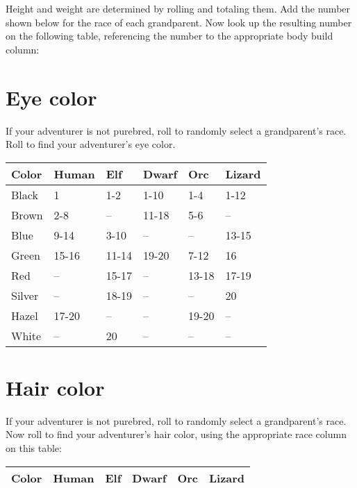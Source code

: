 \begin{multicols*}{2}
\normalsize
Height and weight are determined by rolling  and totaling them. Add the number shown below for the race of each grandparent. Now look up the resulting number on the following table, referencing the number to the appropriate body build column:

\begin{tcbraster}[raster columns=1,boxrule=0pt,title=\small\textbf{Height and Weight Table},left=0pt,right=0pt,top=0pt,bottom=0pt,boxsep=0pt,boxrule=0.6pt,lefttitle=2.5mm,toptitle=1mm,bottomtitle=1mm,colbacktitle=Navy,colback=white]
\end{tcbraster}
\normalsize
\section{Eye color}
If your adventurer is not purebred, roll  to randomly select a grandparent's race. Roll  to find your adventurer's eye color.

\begin{normboxc}
\small
\begin{tabular}{@{}l l l l l l}
\textbf{Color} & \textbf{Human} & \textbf{Elf} & \textbf{Dwarf} & \textbf{Orc} & \textbf{Lizard}\\
\midrule
Black & 1 & 1-2 & 1-10 & 1-4 & 1-12\\
Brown & 2-8 & -- & 11-18 & 5-6 & --\\
Blue & 9-14 & 3-10 & -- & -- & 13-15\\
Green & 15-16 & 11-14 & 19-20 & 7-12 & 16\\
Red & -- & 15-17 & -- & 13-18 & 17-19\\
Silver & -- & 18-19 & -- & -- & 20\\
Hazel & 17-20 & -- & -- & 19-20 & --\\
White & -- & 20 & -- & -- & --
\end{tabular}
\end{normboxc}
\section{Hair color}

If your adventurer is not purebred, roll  to randomly select a grandparent's race. Now roll  to find your adventurer's hair color, using the appropriate race column on this table:
\begin{normboxc}
\small
\begin{tabular}{@{}l l l l l l}
\textbf{Color} & \textbf{Human} & \textbf{Elf} & \textbf{Dwarf} & \textbf{Orc} & \textbf{Lizard}\\
\midrule


\end{tabular}
\end{normboxc}
\end{multicols*}
